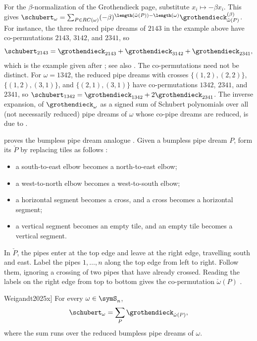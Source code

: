 For the $\beta$-normalization of the Grothendieck page, substitute
$x_i \mapsto -\beta x_i$.  This gives
$\schubert_\omega = \sum_{P \in RC(\omega)}
(-\beta)^{\length(\check{\omega}(P)) - \length(\omega)}
\grothendieck^{(\beta)}_{\check{\omega}(P)}$.
For instance, the three reduced pipe dreams of $2143$ in the example above
have co-permutations $2143$, $3142$, and $2341$, so
\[
  \schubert_{2143} = \grothendieck_{2143} + \grothendieck_{3142} + \grothendieck_{2341},
\]
which is the example given after \cite[Thm.~4]{Lascoux2004}; see also
\cite[Ex.~1.8]{Weigandt2025x}.  The co-permutations need not be distinct.
For $\omega = 1342$, the reduced pipe dreams with crosses
$\{(1,2),(2,2)\}$, $\{(1,2),(3,1)\}$, and $\{(2,1),(3,1)\}$ have
co-permutations $1342$, $2341$, and $2341$, so
$\schubert_{1342} = \grothendieck_{1342} + 2\grothendieck_{2341}$.
The inverse expansion, of $\grothendieck_\omega$ as a signed sum of Schubert
polynomials over all (not necessarily reduced) pipe dreams of $\omega$ whose
co-pipe dreams are reduced, is due to
 \cite[Thm.~1.5]{Weigandt2025x}.

 proves the bumpless pipe dream analogue
\cite[Thms.~1.1 and~1.2]{Weigandt2025x}.  Given a bumpless pipe dream $P$,
form its \label{coBumplessPipeDream} $\check{P}$
by replacing tiles as follows \cite[Lem.~4.9]{Weigandt2025x}:
\begin{itemize}
\item a south-to-east elbow becomes a north-to-east elbow;
\item a west-to-north elbow becomes a west-to-south elbow;
\item a horizontal segment becomes a cross, and a cross becomes a horizontal
segment;
\item a vertical segment becomes an empty tile, and an empty tile becomes a
vertical segment.
\end{itemize}
In $\check{P}$, the pipes enter at the top edge and leave at the right edge,
travelling south and east.  Label the pipes $1, \dotsc, n$ along the top edge
from left to right.  Follow them, ignoring a crossing of two pipes that have
already crossed.  Reading the labels on the right edge from top to bottom
gives the co-permutation $\check{\omega}(P)$
\cite[Sec.~3.1 and Sec.~4.4]{Weigandt2025x}.

\begin{theorem}[\cite[Thm.~1.2]{Weigandt2025x}]
For every $\omega \in \symS_n$,
\[
  \schubert_\omega = \sum_{P} \grothendieck_{\check{\omega}(P)},
\]
where the sum runs over the reduced bumpless pipe dreams of $\omega$.
\end{theorem}

